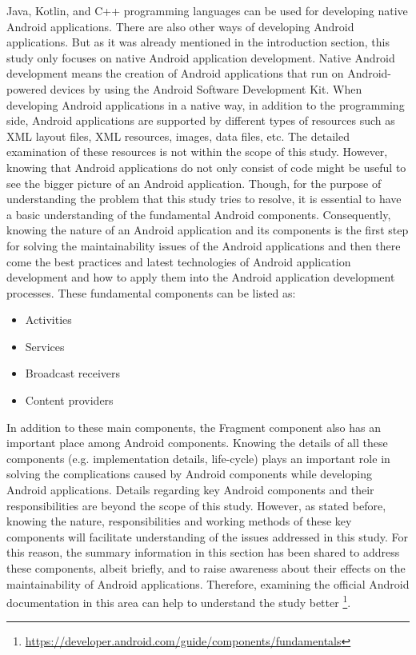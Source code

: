 Java, Kotlin, and C++ programming languages can be used for developing native Android applications. There are also other ways of developing Android applications. But as it was already mentioned in the introduction section, this study only focuses on native Android application development. Native Android development means the creation of Android applications that run on Android-powered devices by using the Android Software Development Kit. When developing Android applications in a native way, in addition to the programming side, Android applications are supported by different types of resources such as XML layout files, XML resources, images, data files, etc. The detailed examination of these resources is not within the scope of this study. However, knowing that Android applications do not only consist of code might be useful to see the bigger picture of an Android application. Though, for the purpose of understanding the problem that this study tries to resolve, it is essential to have a basic understanding of the fundamental Android components. Consequently, knowing the nature of an Android application and its components is the first step for solving the maintainability issues of the Android applications and then there come the best practices and latest technologies of Android application development and how to apply them into the Android application development processes. These fundamental components can be listed as:
\begin{itemize}
    \item Activities
    \item Services
    \item Broadcast receivers
    \item Content providers
\end{itemize}

In addition to these main components, the Fragment component also has an important place among Android components. Knowing the details of all these components (e.g. implementation details, life-cycle) plays an important role in solving the complications caused by Android components while developing Android applications. Details regarding key Android components and their responsibilities are beyond the scope of this study. However, as stated before, knowing the nature, responsibilities and working methods of these key components will facilitate understanding of the issues addressed in this study. For this reason, the summary information in this section has been shared to address these components, albeit briefly, and to raise awareness about their effects on the maintainability of Android applications. Therefore, examining the official Android documentation in this area can help to understand the study better \footnote{\url{https://developer.android.com/guide/components/fundamentals}}.

